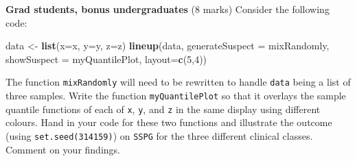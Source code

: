 \documentclass[9pt,letter]{article}
\newenvironment{Shaded}{\begin{snugshade}}{\end{snugshade}}
\newcommand{\KeywordTok}[1]{\textcolor[rgb]{0.13,0.29,0.53}{\textbf{#1}}}
\newcommand{\DataTypeTok}[1]{\textcolor[rgb]{0.13,0.29,0.53}{#1}}
\newcommand{\DecValTok}[1]{\textcolor[rgb]{0.00,0.00,0.81}{#1}}
\newcommand{\StringTok}[1]{\textcolor[rgb]{0.31,0.60,0.02}{#1}}
\newcommand{\NormalTok}[1]{#1}
\begin{document}
\item 

\textbf{Grad students, bonus undergraduates} (8 marks) Consider the
following code:

\begin{Shaded}
\begin{Highlighting}[]
\NormalTok{data <-}\StringTok{ }\KeywordTok{list}\NormalTok{(}\DataTypeTok{x=}\NormalTok{x, }\DataTypeTok{y=}\NormalTok{y, }\DataTypeTok{z=}\NormalTok{z)}
\KeywordTok{lineup}\NormalTok{(data, }
\DataTypeTok{generateSuspect =}\NormalTok{ mixRandomly, }
\DataTypeTok{showSuspect =}\NormalTok{ myQuantilePlot, }
\DataTypeTok{layout=}\KeywordTok{c}\NormalTok{(}\DecValTok{5}\NormalTok{,}\DecValTok{4}\NormalTok{))}
\end{Highlighting}
\end{Shaded}

The function \texttt{mixRandomly} will need to be rewritten to handle
\texttt{data} being a list of three samples. Write the function
\texttt{myQuantilePlot} so that it overlays the sample quantile
functions of each of \texttt{x}, \texttt{y}, and \texttt{z} in the same
display using different colours. Hand in your code for these two
functions and illustrate the outcome (using \texttt{set.seed(314159)})
on \texttt{SSPG} for the three different clinical classes. Comment on
your findings.
\end{document}
